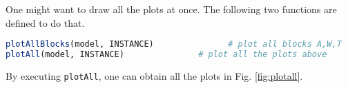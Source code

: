 One might want to draw all the plots at once. The following two functions are defined to do that.
\begin{lstlisting}[frame=single,language=julia]
plotAllBlocks(model, INSTANCE)               # plot all blocks A,W,T
plotAll(model, INSTANCE)               # plot all the plots above
\end{lstlisting}

By executing \texttt{plotAll}, one can obtain all the plots in Fig. \ref{fig:plotall}.


%
%
%
